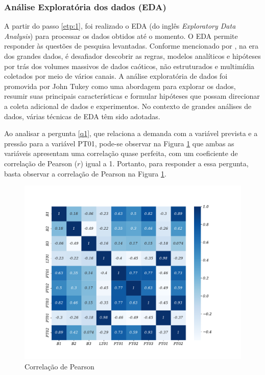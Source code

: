 \subsubsection{An\'alise Explorat\'oria dos dados (EDA)}

A partir do passo \ref{etp:1}, foi realizado o EDA (do inglês \textit{Exploratory Data Analysis}) para processar os dados obtidos até o momento. O EDA permite responder às questões de pesquisa levantadas. Conforme mencionado por , na era dos grandes dados, é desafiador descobrir as regras, modelos analíticos e hipóteses por trás dos volumes massivos de dados caóticos, não estruturados e multimídia coletados por meio de vários canais. A análise exploratória de dados foi promovida por John Tukey como uma abordagem para explorar os dados, resumir suas principais características e formular hipóteses que possam direcionar a coleta adicional de dados e experimentos. No contexto de grandes análises de dados, várias técnicas de EDA têm sido adotadas.

Ao analisar a pergunta \ref{q1}, que relaciona a demanda com a variável prevista e a pressão para a variável PT01, pode-se observar na Figura \ref{fig:person} que ambas as variáveis apresentam uma correlação quase perfeita, com um coeficiente de correlação de Pearson ($r$) igual a 1. Portanto, para responder a essa pergunta, basta observar a correlação de Pearson na Figura \ref{fig:person}.

\begin{figure}[H]
	\centering
	\caption{Correlação de Pearson}
	\label{fig:person}
	\includegraphics[width=0.9\linewidth]{Apendices/Figuras/modelagem-24h/person}
	
\end{figure}

